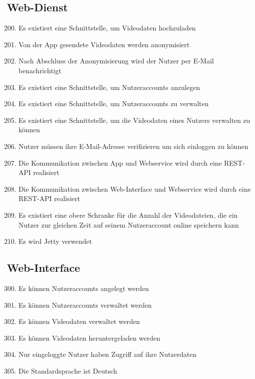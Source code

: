\subsection{Web-Dienst}
	\begin{enumerate}[\bfseries{PK}10]
	\setcounter{enumi}{199}
	\item Es existiert eine Schnittstelle, um Videodaten hochzuladen
	\item Von der App gesendete Videodaten werden anonymisiert
	\item Nach Abschluss der Anonymisierung wird der Nutzer per E-Mail benachrichtigt
	\item Es existiert eine Schnittstelle, um Nutzeraccounts anzulegen
	\item Es existiert eine Schnittstelle, um Nutzeraccounts zu verwalten
	\item Es existiert eine Schnittstelle, um die Videodaten eines Nutzers verwalten zu können
	\item Nutzer müssen ihre E-Mail-Adresse verifizieren um sich einloggen zu können
	\item Die Kommunikation zwischen App und Webservice wird durch eine REST-API realisiert
	\item Die Kommunikation zwischen Web-Interface und Webservice wird durch eine REST-API realisiert
	\item Es existiert eine obere Schranke für die Anzahl der Videodateien, die ein Nutzer zur gleichen Zeit auf seinem Nutzeraccount online speichern kann
	\item Es wird Jetty verwendet
	\end{enumerate}
\subsection{Web-Interface}
	\begin{enumerate}[\bfseries{PK}10]
	\setcounter{enumi}{299}
	\item Es können Nutzeraccounts angelegt werden
	\item Es können Nutzeraccounts verwaltet werden
	\item Es können Videodaten verwaltet werden
	\item Es können Videodaten heruntergeladen werden
	\item Nur eingeloggte Nutzer haben Zugriff auf ihre Nutzerdaten
	\item Die Standardsprache ist Deutsch
	\end{enumerate}

